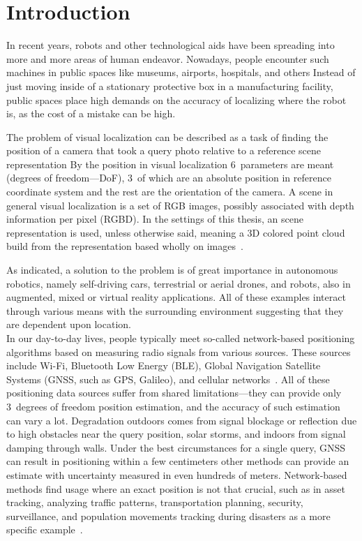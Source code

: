 \chapter*{Introduction} \label{intro}

In recent years, robots and other technological aids have been spreading into more and more
areas of human endeavor. Nowadays, people encounter such machines in public spaces
like museums, airports, hospitals, and others
Instead of just moving inside of a stationary
protective box in a manufacturing facility, public spaces place high demands on
the accuracy of localizing where the robot is, as the cost of a mistake can be high.

The problem of visual localization can be described as a task of finding
the position of a camera that took a query photo relative to a reference scene
representation
By the position in visual localization
6~parameters are meant (degrees of freedom---DoF), 3~of which are an absolute position in
reference coordinate system and the rest are the orientation of the camera.
A scene in general visual localization is a set
of RGB images, possibly associated with depth information per pixel (RGBD).
In the settings of this thesis, an  scene representation
is used, unless otherwise said, meaning a 3D colored point cloud build from the 
representation based wholly on images~\citep{SOTARendering}.

As indicated, a solution to the problem is of great importance in autonomous robotics,
namely self-driving cars, terrestrial or aerial drones, and robots, also in augmented,
mixed or virtual reality applications. All of these examples interact through various
means with the surrounding environment suggesting that they are dependent upon location.\\

In our day-to-day lives, people typically meet so-called network-based positioning algorithms based on measuring
radio signals from various sources. These sources include Wi-Fi, Bluetooth Low Energy (BLE), Global Navigation
Satellite Systems (GNSS, such as GPS, Galileo), and cellular networks~\citep{Trogh2019}. All of these positioning
data sources suffer from shared limitations---they
can provide only 3~degrees of freedom position estimation, and the accuracy of such estimation can vary a lot.
Degradation outdoors comes from signal blockage or reflection due to high obstacles near the query position,
solar storms, and indoors from signal damping through walls. Under the
best circumstances for a single query, GNSS can result in positioning within a few
centimeters
other methods can provide an estimate with uncertainty measured in even hundreds of meters. Network-based methods
find usage where an exact position is not that crucial, such as in asset tracking,
analyzing traffic patterns, transportation planning, security, surveillance, and population
movements tracking during disasters as a more specific example~\citep{Trogh2019}.


